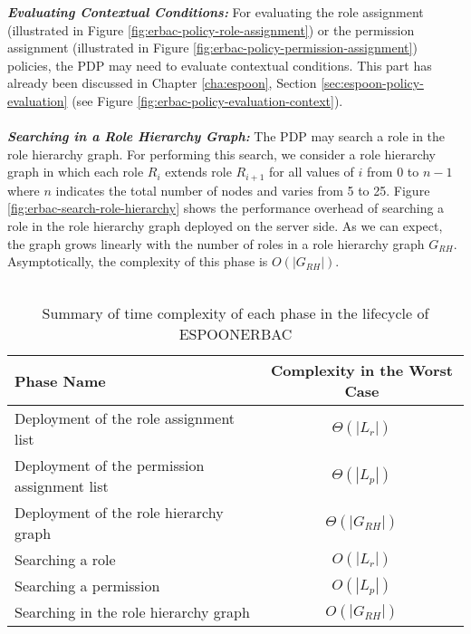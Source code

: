 \documentclass[epsfig,a4paper,11pt,titlepage]{book}
\numberwithin{algorithm}{chapter}
\begin{document}
\noindent \emph{\textbf{Evaluating Contextual Conditions:}}
For evaluating the role assignment (illustrated in Figure \ref{fig:erbac-policy-role-assignment}) or the permission assignment (illustrated in Figure \ref{fig:erbac-policy-permission-assignment}) policies, the \gls{PDP} may need to evaluate contextual conditions. This part has already been discussed in Chapter \ref{cha:espoon}, Section \ref{sec:espoon-policy-evaluation} (see Figure \ref{fig:erbac-policy-evaluation-context}). \\ \\
\noindent \emph{\textbf{Searching in a Role Hierarchy Graph:}}
The \gls{PDP} may search a role in the role hierarchy graph. For performing this search, we consider a role hierarchy graph in which each role $R_i$ extends role $R_{i+1}$ for all values of $i$ from 0 to $n - 1$ where $n$ indicates the total number of nodes and varies from 5 to 25. Figure \ref{fig:erbac-search-role-hierarchy} shows the performance overhead of searching a role in the role hierarchy graph deployed on the server side. As we can expect, the graph grows linearly with the number of roles in a role hierarchy graph $G_{RH}$. Asymptotically, the complexity of this phase is $O(|G_{RH}|)$. \\ \\


\begin{table} [htp]
\centering
\caption[Time complexity of each phase in the lifecycle of ESPOON$_{\mathit{ERBAC}}$]{Summary of time complexity of each phase in the lifecycle of \gls{ESPOONERBAC}}
\label{tab:erbac-complexity-summary}

\begin{tabular}{ |l|c| } 

\hline

\textbf{Phase Name} & \textbf{Complexity in the Worst Case} \\ \hline

Deployment of the role assignment list & ${\Theta}(| L_r |)$ \\ \hline

Deployment of the permission assignment list & ${\Theta}(| L_p |)$ \\ \hline

Deployment of the role hierarchy graph & ${\Theta}(| G_{RH} |)$ \\ \hline

Searching a role & $O(| L_r |)$ \\ \hline

Searching a permission & $O(| L_p |)$ \\ \hline

Searching in the role hierarchy graph & $O(| G_{RH} |)$ \\ \hline

\end{tabular}

\end{table}
\end{document}
